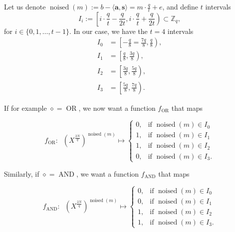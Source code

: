 Let us denote $\operatorname{noised}(m) := b - \langle \mathbf{a}, \mathbf{s} \rangle = m \cdot \frac{q}{t} + e$, and define $t$ intervals
$$I_i := \left[ i \cdot \frac{q}{t} - \frac{q}{2t},  i \cdot \frac{q}{t} + \frac{q}{2t}\right) \subset \mathbb{Z}_q,$$
for $i \in \{0,1, \dots, t-1 \}$. In our case, we have the $t=4$ intervals
\begin{align*}
    I_0 &= \left[-\frac{q}{8}=\frac{7q}{8}, \frac{q}{8}\right), \\
    I_1 &= \left[\frac{q}{8}, \frac{3q}{8}\right), \\
    I_2 &= \left[\frac{3q}{8}, \frac{5q}{8}\right), \\
    I_3 &= \left[\frac{5q}{8}, \frac{7q}{8}\right).
\end{align*}

If for example $\diamond = \operatorname{OR}$, we now want a function $f_{\operatorname{OR}}$ that maps

\begin{equation*}
  f_{\operatorname{OR}}: \;\; \left (X^{\frac{2N}{q}}\right)^{\operatorname{noised}(m)} \mapsto
    \begin{cases}
      0, & \text{if $\operatorname{noised}(m) \in I_0$} \\
      1, & \text{if $\operatorname{noised}(m) \in I_1$} \\
      1, & \text{if $\operatorname{noised}(m) \in I_2$} \\
      0, & \text{if $\operatorname{noised}(m) \in I_3$}.
    \end{cases}
\end{equation*}

Similarly, if $\diamond = \operatorname{AND}$, we want a function $f_{\operatorname{AND}}$ that maps

\begin{equation*}
  f_{\operatorname{AND}}: \;\; \left (X^{\frac{2N}{q}}\right)^{\operatorname{noised}(m)} \mapsto
    \begin{cases}
      0, & \text{if $\operatorname{noised}(m) \in I_0$} \\
      0, & \text{if $\operatorname{noised}(m) \in I_1$} \\
      1, & \text{if $\operatorname{noised}(m) \in I_2$} \\
      1, & \text{if $\operatorname{noised}(m) \in I_3$}.
    \end{cases}
\end{equation*}

